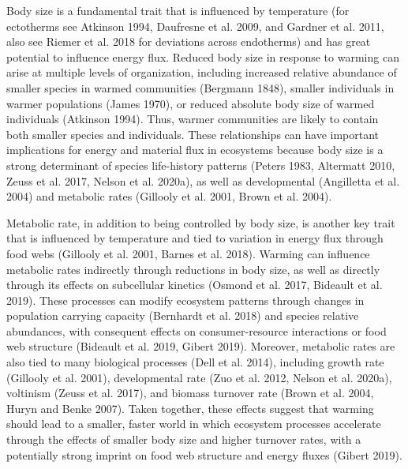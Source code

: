 \documentclass[
]{article}
\numberwithin{equation}
\begin{document}
Body size is a fundamental trait that is influenced by temperature (for
ectotherms see Atkinson 1994, Daufresne et al. 2009, and Gardner et al.
2011, also see Riemer et al. 2018 for deviations across endotherms) and
has great potential to influence energy flux. Reduced body size in
response to warming can arise at multiple levels of organization,
including increased relative abundance of smaller species in warmed
communities (Bergmann 1848), smaller individuals in warmer populations
(James 1970), or reduced absolute body size of warmed individuals
(Atkinson 1994). Thus, warmer communities are likely to contain both
smaller species and individuals. These relationships can have important
implications for energy and material flux in ecosystems because body
size is a strong determinant of species life-history patterns (Peters
1983, Altermatt 2010, Zeuss et al. 2017, Nelson et al. 2020a), as well
as developmental (Angilletta et al. 2004) and metabolic rates (Gillooly
et al. 2001, Brown et al. 2004).

Metabolic rate, in addition to being controlled by body size, is another
key trait that is influenced by temperature and tied to variation in
energy flux through food webs (Gillooly et al. 2001, Barnes et al.
2018). Warming can influence metabolic rates indirectly through
reductions in body size, as well as directly through its effects on
subcellular kinetics (Osmond et al. 2017, Bideault et al. 2019). These
processes can modify ecosystem patterns through changes in population
carrying capacity (Bernhardt et al. 2018) and species relative
abundances, with consequent effects on consumer-resource interactions or
food web structure (Bideault et al. 2019, Gibert 2019). Moreover,
metabolic rates are also tied to many biological processes (Dell et al.
2014), including growth rate (Gillooly et al. 2001), developmental rate
(Zuo et al. 2012, Nelson et al. 2020a), voltinism (Zeuss et al. 2017),
and biomass turnover rate (Brown et al. 2004, Huryn and Benke 2007).
Taken together, these effects suggest that warming should lead to a
smaller, faster world in which ecosystem processes accelerate through
the effects of smaller body size and higher turnover rates, with a
potentially strong imprint on food web structure and energy fluxes
(Gibert 2019).
\end{document}
